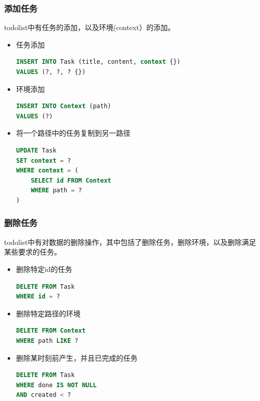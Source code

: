 \documentclass[a4paper, 11pt]{article}
\begin{document}
\subsubsection{添加任务}
\par todolist中有任务的添加，以及环境(context）的添加。
\begin{itemize}
\item 任务添加
\begin{lstlisting}[language=SQL]
INSERT INTO Task (title, content, context {})
VALUES (?, ?, ? {})
\end{lstlisting}
\item 环境添加
\begin{lstlisting}[language=SQL]
INSERT INTO Context (path)
VALUES (?)
\end{lstlisting}
\item 将一个路径中的任务复制到另一路径
\begin{lstlisting}[language=SQL]
UPDATE Task
SET context = ?
WHERE context = (
	SELECT id FROM Context
	WHERE path = ?
)
\end{lstlisting}
\end{itemize}

\subsubsection{删除任务}
\par todolist中有对数据的删除操作，其中包括了删除任务，删除环境，以及删除满足某些要求的任务。
\begin{itemize}
\item 删除特定id的任务
\begin{lstlisting}[language=SQL]
DELETE FROM Task
WHERE id = ?
\end{lstlisting}
\item 删除特定路径的环境
\begin{lstlisting}[language=SQL]
DELETE FROM Context
WHERE path LIKE ?
\end{lstlisting}
\item 删除某时刻前产生，并且已完成的任务
\begin{lstlisting}[language=SQL]
DELETE FROM Task
WHERE done IS NOT NULL
AND created < ?
\end{lstlisting}
\end{itemize}
\end{document}
